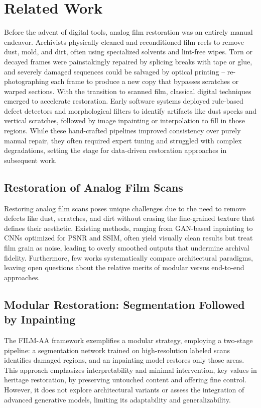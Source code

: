\documentclass[10pt,a4paper,twocolumn,twoside]{article}
\begin{document}
\section{Related Work}
Before the advent of digital tools, analog film restoration was an entirely manual endeavor. Archivists physically cleaned and reconditioned film reels to remove dust, mold, and dirt, often using specialized solvents and lint-free wipes. Torn or decayed frames were painstakingly repaired by splicing breaks with tape or glue, and severely damaged sequences could be salvaged by optical printing – re-photographing each frame to produce a new copy that bypasses scratches or warped sections. With the transition to scanned film, classical digital techniques emerged to accelerate restoration. Early software systems deployed rule-based defect detectors and morphological filters to identify artifacts like dust specks and vertical scratches, followed by image inpainting or interpolation to fill in those regions. While these hand-crafted pipelines improved consistency over purely manual repair, they often required expert tuning and struggled with complex degradations, setting the stage for data-driven restoration approaches in subsequent work. \cite{croci2015advanced}

\subsection{Restoration of Analog Film Scans}
Restoring analog film scans poses unique challenges due to the need to remove defects like dust, scratches, and dirt without erasing the fine-grained texture that defines their aesthetic. Existing methods, ranging from GAN-based inpainting \cite{gan} to CNNs optimized for PSNR and SSIM, often yield visually clean results but treat film grain as noise, leading to overly smoothed outputs that undermine archival fidelity. Furthermore, few works systematically compare architectural paradigms, leaving open questions about the relative merits of modular versus end-to-end approaches. \cite{survey} 
\vspace*{-0.8em}
\subsection{Modular Restoration: Segmentation Followed by Inpainting}
The FILM-AA framework exemplifies a modular strategy, employing a two-stage pipeline: a segmentation network trained on high-resolution labeled scans identifies damaged regions, and an inpainting model restores only those areas. This approach emphasizes interpretability and minimal intervention, key values in heritage restoration, by preserving untouched content and offering fine control. However, it does not explore architectural variants or assess the integration of advanced generative models, limiting its adaptability and generalizability.
\vspace*{-0.8em}
\end{document}
